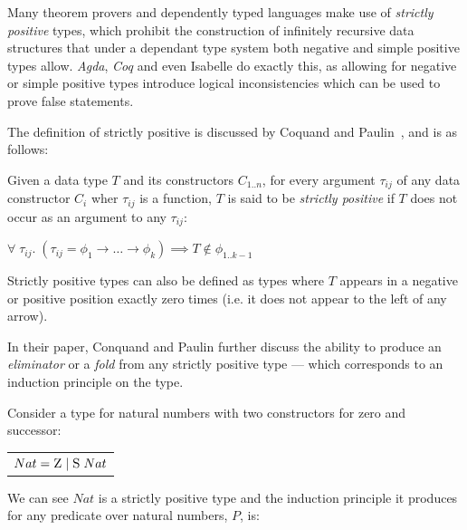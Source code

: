 Many theorem provers and dependently typed languages make use of \textit{strictly positive} types, which
prohibit the construction of infinitely recursive data structures that under a dependant type system
both negative and simple positive types allow.
\textit{Agda}\citep{AgdaStrictlyPositive}, \textit{Coq}\citep{CoqStrictlyPositive} and even
Isabelle\citep{IsabelleStrictlyPositive} do exactly this, as allowing for negative or simple positive
types introduce logical inconsistencies which can be used to prove false statements.

The definition of strictly positive is discussed by Coquand and Paulin~\cite{CoquandTypes}, and is as follows:

\theoremstyle{definition}
\begin{definition}
    \label{def:sp}
    Given a data type $T$ and its constructors $C_{1..n}$, for every argument $\tau_{ij}$
    of any data constructor $C_i$ wher $\tau_{ij}$ is a function, $T$ is said to be \textit{strictly positive} if 
    $T$ does not occur as an argument to any $\tau_{ij}$:

    \begin{center}
        $\forall\; \tau_{ij}.\;
        (\tau_{ij} = \phi_{1} \rightarrow \dots \rightarrow \phi_{k})
        \implies T \notin \phi_{1..k-1}$
    \end{center}
\end{definition}

Strictly positive types can also be defined as types where $T$ appears in a negative or positive 
position exactly zero times (i.e. it does not appear to the left of any arrow).

In their paper, Conquand and Paulin further discuss the ability to produce an \textit{eliminator} or a
\textit{fold} from any strictly positive type --- which corresponds to an induction principle on the type.

Consider a type for natural numbers with two constructors for zero and successor:

\begin{center}
    \begin{tabular}{l}
        $Nat = \textsc{Z}\; \vert\; \textsc{S}\; Nat$ \\
    \end{tabular} 
\end{center}

We can see $Nat$ is a strictly positive type and the induction principle it produces
for any predicate over natural numbers, $P$, is:


